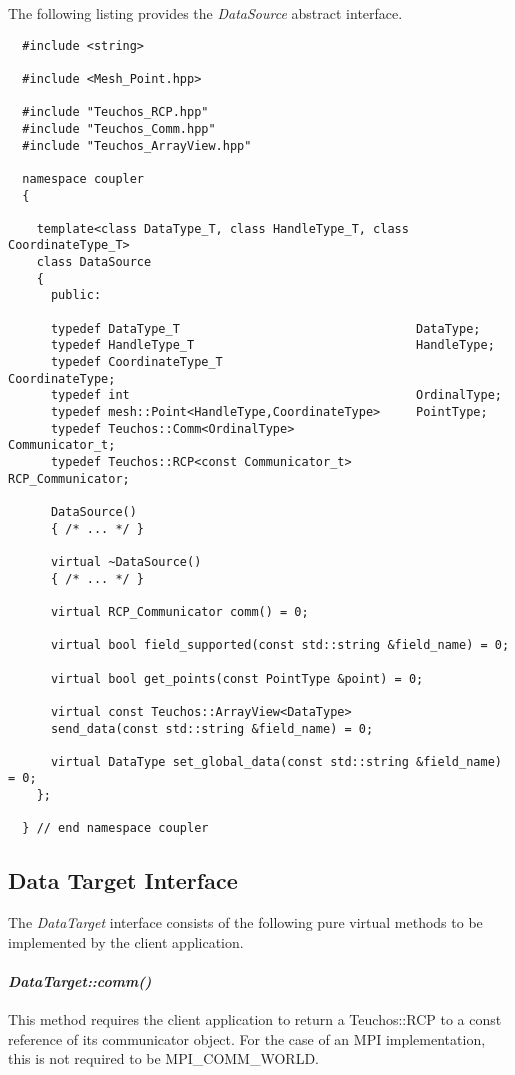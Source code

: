 \documentclass[letterpaper]{article}
\begin{document}
The following listing provides the {\sl DataSource} abstract
interface. 

\begin{lstlisting}
  #include <string>

  #include <Mesh_Point.hpp>

  #include "Teuchos_RCP.hpp"
  #include "Teuchos_Comm.hpp" 
  #include "Teuchos_ArrayView.hpp"

  namespace coupler
  {

    template<class DataType_T, class HandleType_T, class CoordinateType_T>
    class DataSource 
    {
      public:

      typedef DataType_T                                 DataType;
      typedef HandleType_T                               HandleType;
      typedef CoordinateType_T                           CoordinateType;
      typedef int                                        OrdinalType;
      typedef mesh::Point<HandleType,CoordinateType>     PointType;
      typedef Teuchos::Comm<OrdinalType>                 Communicator_t;
      typedef Teuchos::RCP<const Communicator_t>         RCP_Communicator;

      DataSource()
      { /* ... */ }

      virtual ~DataSource()
      { /* ... */ }

      virtual RCP_Communicator comm() = 0;

      virtual bool field_supported(const std::string &field_name) = 0;

      virtual bool get_points(const PointType &point) = 0;

      virtual const Teuchos::ArrayView<DataType> 
      send_data(const std::string &field_name) = 0;

      virtual DataType set_global_data(const std::string &field_name) = 0;
    };

  } // end namespace coupler
\end{lstlisting}

\subsection{Data Target Interface}
The {\sl DataTarget} interface consists of the following pure
virtual methods to be implemented by the client application.

\paragraph{\sl DataTarget::comm()}
This method requires the client application to return a Teuchos::RCP
to a const reference of its communicator object. For the case of an
MPI implementation, this is not required to be MPI\_COMM\_WORLD.
\end{document}
